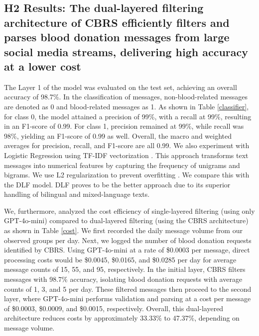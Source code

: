 \documentclass[11pt]{article}
\begin{document}
\subsection{H2 Results: The dual-layered filtering architecture of CBRS efficiently filters and parses blood donation messages from large social media streams, delivering high accuracy at a lower cost}
The Layer 1 of the model was evaluated on the test set, achieving an overall accuracy of 98.7\%. In the classification of messages, non-blood-related messages are denoted as 0 and blood-related messages as 1. As shown in Table \ref{classifier}, for class 0, the model attained a precision of 99\%, with a recall at 99\%, resulting in an F1-score of 0.99. For class 1, precision remained at 99\%, while recall was 98\%, yielding an F1-score of 0.99 as well. Overall, the macro and weighted averages for precision, recall, and F1-score are all 0.99. We also experiment with Logistic Regression using TF-IDF vectorization \cite{24shah2020comparative}. This approach transforms text messages into numerical features by capturing the frequency of unigrams and bigrams. We use L2 regularization to prevent overfitting \cite{25kolluri2020reducing}. We compare this with the DLF model. DLF proves to be the better approach due to its superior handling of bilingual and mixed-language texts. 
\begin{table}[h]
    \centering
    \caption{Classification report of Layer 1 framework}
    \label{classifier}
\end{table}


We, furthermore, analyzed the cost efficiency of single-layered filtering (using only GPT-4o-mini) compared to dual-layered filtering (using the CBRS architecture) as shown in Table \ref{cost}. We first recorded the daily message volume from our observed groups per day. Next, we logged the number of blood donation requests identified by CBRS. Using GPT-4o-mini at a rate of \$0.0003 per message, direct processing costs would be \$0.0045, \$0.0165, and \$0.0285 per day for average message counts of 15, 55, and 95, respectively.  In the initial layer, CBRS filters messages with 98.7\% accuracy, isolating blood donation requests with average counts of 1, 3, and 5 per day. These filtered messages then proceed to the second layer, where GPT-4o-mini performs validation and parsing at a cost per message of \$0.0003, \$0.0009, and \$0.0015, respectively. Overall, this dual-layered architecture reduces costs by approximately 33.33\% to 47.37\%, depending on message volume.
\end{document}

